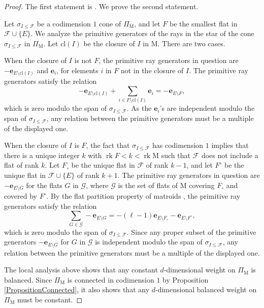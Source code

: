 \documentclass[11pt,reqno]{amsart}
\theoremstyle{definition}
\theoremstyle{remark}
\renewcommand{\(}{\left(}
\renewcommand{\)}{\right)}
\newcommand{\<}{\left<}
\renewcommand{\>}{\right>}
\newcommand{\rk}{\operatorname{rk}}
\begin{document}
\begin{proof}
The first statement is \cite[Proposition 5.2]{AHK}.
We prove the second statement.

Let $\sigma_{I \le \mathscr{F}}$ be a codimension $1$ cone of $\Pi_\mathrm{M}$,
and let $F$ be the smallest flat in $\mathscr{F} \cup \{E\}$. 
We analyze the primitive generators of the rays in the star of the cone $\sigma_{I \le \mathscr{F}}$ in $\Pi_\mathrm{M}$.
Let $\text{cl}(I)$ be the closure of $I$ in $\mathrm{M}$.
There are two cases.

When the closure of $I$ is not $F$,
 the primitive ray generators in question are $-\mathbf{e}_{E \setminus \text{cl}(I)}$ and $\mathbf{e}_i$, for elements $i$ in $F$ not in the closure of $I$.
The primitive ray generators satisfy the relation
\[
-\mathbf{e}_{E \setminus \text{cl}(I)}+\sum_{i \in F \setminus \text{cl}(I)} \mathbf{e}_i=-\mathbf{e}_{E \setminus F},
\]
which is zero modulo the span of $\sigma_{I \le \mathscr{F}}$.
As the  $\mathbf{e}_i$'s   are independent modulo the span of $\sigma_{I \le \mathscr{F}}$,
any relation between the primitive generators must be a multiple of the displayed one.

When the closure of $I$ is $F$, the fact that $\sigma_{I \le \mathscr{F}}$ has codimension $1$ implies that
there is a unique integer $k$ with $\rk F < k < \rk \mathrm{M}$ such that $\mathscr{F}$ does not include a flat of rank $k$.
Let $F_\circ$ be the unique flat in $\mathscr{F}$ of rank $k-1$, and let $F^\circ$ be the unique flat in $\mathscr{F} \cup \{E\}$
of rank $k+1$.
The primitive ray generators in question are  $-\mathbf{e}_{E \setminus G}$ for the flats $G$ in $\mathscr{G}$, 
where  $\mathscr{G}$ is the set of flats of $\mathrm{M}$ covering $F_\circ$ and covered by $F^\circ$.
By the flat partition property of matroids \cite[Section 1.4]{Oxley}, the primitive ray generators satisfy the relation
\[
\sum_{G \in \mathscr{G}} -\mathbf{e}_{E \setminus G}=-(\ell-1)\mathbf{e}_{E \setminus F_\circ} -\mathbf{e}_{E \setminus F^\circ},
\]
which is zero modulo the span of $\sigma_{I \le \mathscr{F}}$.
Since any proper subset of the primitive generators $-\mathbf{e}_{E \setminus G}$  for $G$ in $\mathscr{G}$ is independent modulo the span of $\sigma_{I \le \mathscr{F}}$,
any relation between the primitive generators must be a multiple of the displayed one.

The local analysis above shows that any constant $d$-dimensional weight on $\Pi_\mathrm{M}$ is balanced.
Since $\Pi_\mathrm{M}$ is connected in codimension $1$ by Proposition \ref{PropositionConnected},
it also shows that any $d$-dimensional balanced weight  on $\Pi_\mathrm{M}$ must be constant.
\end{proof}
\end{document}
